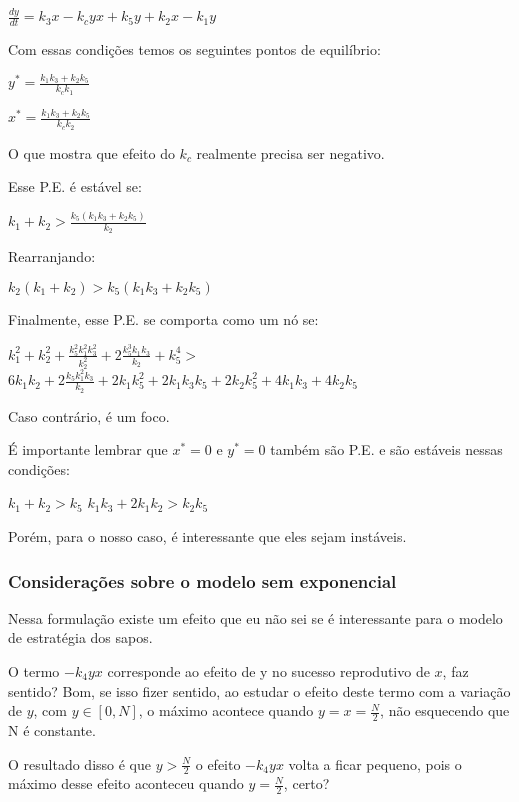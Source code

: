 \vspace{3 mm}
$\frac{dy}{dt} = k_3 x - k_c y x + k_5 y + k_2 x - k_1 y$

Com essas condições temos os seguintes pontos de equilíbrio:

$y^* = \frac{k_1 k_3 + k_2 k_5}{k_c k_1}$

\vspace{3 mm}
$x^* = \frac{k_1 k_3 + k_2 k_5}{k_c k_2}$

O que mostra que efeito do $k_c$ realmente precisa ser negativo.

Esse P.E. é estável se:


$k_1 + k_2 > \frac{k_5(k_1 k_3 + k_2 k_5)}{k_2}$
\vspace{3 mm}

Rearranjando:

\vspace{3 mm}
$k_2(k_1 + k_2) > k_5(k_1 k_3 + k_2 k_5)$

Finalmente, esse P.E. se comporta como um nó se:

$k^2_1 + k_2^2 + \frac{k_5^2 k_1^2 k_3^2}{k_2^2} +2 \frac{k_5^3 k_1 k_3}{k_2} +k_5^4 > $
$ 6 k_1 k_2 + 2 \frac{k_5 k_1^2 k_3}{k_2} + 2 k_1 k_5^2 + 2k_1 k_3 k_5 + 2 k_2 k_5^2 + 4 k_1 k_3 + 4 k_2 k_5$ 

Caso contrário, é um foco.

É importante lembrar que $x^*=0$ e $y^*=0$ também são P.E. e são estáveis nessas condições:

\vspace{3 mm}
$k_1 + k_2 > k_5$
$k_1 k_3 + 2k_1 k_2 > k_2 k_5$

Porém, para o nosso caso, é interessante que eles sejam instáveis.

\subsubsection{Considerações sobre o modelo sem exponencial}
Nessa formulação existe um efeito que eu não sei se é interessante para o modelo de estratégia dos sapos.

O termo $-k_4 yx$ corresponde ao efeito de y no sucesso reprodutivo de $x$, faz sentido? Bom, se isso fizer sentido, ao estudar o efeito deste termo com a variação de $y$, com $y \in [0,N]$, o máximo acontece quando $y=x=\frac{N}{2}$, não esquecendo que N é constante.

O resultado disso é que $y > \frac{N}{2}$ o efeito $-k_4 yx$ volta a ficar pequeno, pois o máximo desse efeito aconteceu quando $y=\frac{N}{2}$, certo?